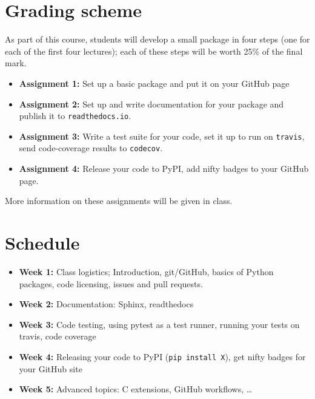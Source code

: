 \documentclass{article}
\begin{document}
\section*{Grading scheme}

As part of this course, students will develop a small package in four
steps (one for each of the first four lectures); each of these steps
will be worth 25\% of the final mark.

\begin{itemize}

  \item {\bf Assignment 1:} Set up a basic package and put it on your GitHub page

  \item {\bf Assignment 2:} Set up and write documentation for your package and publish it to \texttt{readthedocs.io}.

  \item {\bf Assignment 3:} Write a test suite for your code, set it
    up to run on \texttt{travis}, send code-coverage results to
    \texttt{codecov}.

  \item {\bf Assignment 4:} Release your code to PyPI, add nifty
    badges to your GitHub page.

\end{itemize}

More information on these assignments will be given in class.

\section*{Schedule}

\begin{itemize}

  \item {\bf Week 1:} Class logistics; Introduction, git/GitHub,
    basics of Python packages, code licensing, issues and pull
    requests.

  \item {\bf Week 2:} Documentation: Sphinx, readthedocs

  \item {\bf Week 3:} Code testing, using pytest as a test runner,
    running your tests on travis, code coverage

  \item {\bf Week 4:} Releasing your code to PyPI (\texttt{pip install
    X}), get nifty badges for your GitHub site

  \item {\bf Week 5:} Advanced topics: C extensions, GitHub workflows, \ldots

\end{itemize}
\end{document}

